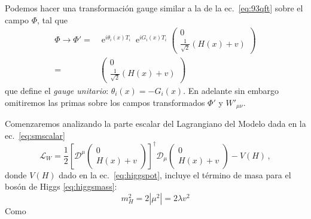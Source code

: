 \begin{frame}
Podemos hacer una transformación gauge similar a la de la 
ec.~\eqref{eq:93qft} sobre el campo $\Phi$, tal que
\begin{align}
  \label{eq:123qft}
    {\Phi}\to{\Phi}'=&\operatorname{e}^{i \theta_i(x) T_i}\operatorname{e}^{i G_i(x) T_i}
  \begin{pmatrix}
    0\\
    \frac{1}{\sqrt{2}}(H(x)+v)
  \end{pmatrix}\nonumber\\
  =&\begin{pmatrix}
    0\\
    \frac{1}{\sqrt{2}}(H(x)+v)
  \end{pmatrix}
\end{align}
que define el \emph{gauge unitario}: $\theta_i(x)=-G_i(x)$. En adelante sin embargo omitiremos las primas sobre los campos transformados ${\Phi}'$ y $W'_{\mu\nu}$.
\end{frame}
Comenzaremos analizando la parte escalar del Lagrangiano del Modelo dada en la ec.~\eqref{eq:smscalar}
\begin{equation}
  \mathcal{L}_{W}=\frac{1}{2}\left[\mathcal{D}^\mu \begin{pmatrix}
    0\\
    H(x)+v
  \end{pmatrix}\right]^{\dagger} \mathcal{D}_\mu\begin{pmatrix}
    0\\
    H(x)+v
  \end{pmatrix}-V(H)\,,
\end{equation}
donde $V(H)$ dado en la ec.~\eqref{eq:higgspot}, incluye el término de masa para el bosón de Higgs \eqref{eq:higgsmass}:
\begin{equation}
  m_H^2=2\left|\mu^2\right|=2\lambda v^2
\end{equation}
Como

